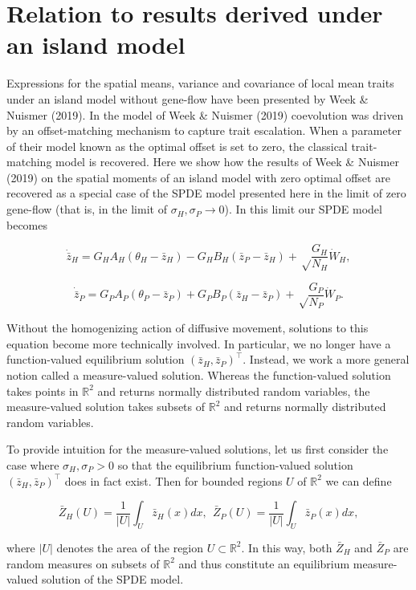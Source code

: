 \documentclass{article}
\begin{document}
\hypertarget{relation-to-results-derived-under-an-island-model}{%
\section{Relation to results derived under an island
model}\label{relation-to-results-derived-under-an-island-model}}

Expressions for the spatial means, variance and covariance of local mean
traits under an island model without gene-flow have been presented by
Week \& Nuismer (2019). In the model of Week \& Nuismer (2019)
coevolution was driven by an offset-matching mechanism to capture trait
escalation. When a parameter of their model known as the optimal offset
is set to zero, the classical trait-matching model is recovered. Here we
show how the results of Week \& Nuismer (2019) on the spatial moments of
an island model with zero optimal offset are recovered as a special case
of the SPDE model presented here in the limit of zero gene-flow (that
is, in the limit of \(\sigma_H,\sigma_P\to0\)). In this limit our SPDE
model becomes

\[\dot{\bar z}_H=G_HA_H(\theta_H-\bar z_H)-G_HB_H(\bar z_P-\bar z_H)+\sqrt\frac{G_H}{N_H}\dot W_H,\]

\[\dot{\bar z}_P=G_PA_P(\theta_P-\bar z_P)+G_PB_P(\bar z_H-\bar z_P)+\sqrt\frac{G_P}{N_P}\dot W_P.\]

Without the homogenizing action of diffusive movement, solutions to this
equation become more technically involved. In particular, we no longer
have a function-valued equilibrium solution
\((\bar z_H,\bar z_P)^\top\). Instead, we work a more general notion
called a measure-valued solution. Whereas the function-valued solution
takes points in \(\mathbb R^2\) and returns normally distributed random
variables, the measure-valued solution takes subsets of \(\mathbb R^2\)
and returns normally distributed random variables.

To provide intuition for the measure-valued solutions, let us first
consider the case where \(\sigma_H,\sigma_P>0\) so that the equilibrium
function-valued solution \((\bar z_H,\bar z_P)^\top\) does in fact
exist. Then for bounded regions \(U\) of \(\mathbb R^2\) we can define

\[\bar Z_H(U)=\frac{1}{|U|}\int_U\bar z_H(x)dx, \ \ \bar Z_P(U)=\frac{1}{|U|}\int_U\bar z_P(x)dx,\]

where \(|U|\) denotes the area of the region \(U\subset\mathbb R^2\). In
this way, both \(\bar Z_H\) and \(\bar Z_P\) are random measures on
subsets of \(\mathbb R^2\) and thus constitute an equilibrium
measure-valued solution of the SPDE model.
\end{document}
